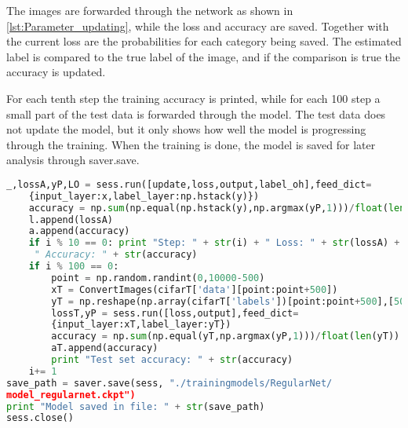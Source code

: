 The images are forwarded through the network as shown in \ref{lst:Parameter_updating}, while the loss and accuracy are saved. Together with the current loss are the probabilities for each category being saved. The estimated label is compared to the true label of the image, and if the comparison is true the accuracy is updated.

For each tenth step the training accuracy is printed, while for each 100 step a small part of the test data is forwarded through the model. The test data does not update the model, but it only shows how well the model is progressing through the training. When the training is done, the model is saved for later analysis through saver.save.

\begin{lstlisting}[language=Python, label=lst:Parameter_updating, caption=Parameter updating: loss and accuracy are saved and they are tested every 100 steps]
	_,lossA,yP,LO = sess.run([update,loss,output,label_oh],feed_dict=
	{input_layer:x,label_layer:np.hstack(y)})
	accuracy = np.sum(np.equal(np.hstack(y),np.argmax(yP,1)))/float(len(y))
	l.append(lossA)
	a.append(accuracy)
	if i % 10 == 0: print "Step: " + str(i) + " Loss: " + str(lossA) +
	 " Accuracy: " + str(accuracy)
	if i % 100 == 0: 
		point = np.random.randint(0,10000-500)
		xT = ConvertImages(cifarT['data'][point:point+500]) 
		yT = np.reshape(np.array(cifarT['labels'])[point:point+500],[500])
		lossT,yP = sess.run([loss,output],feed_dict=
		{input_layer:xT,label_layer:yT})
		accuracy = np.sum(np.equal(yT,np.argmax(yP,1)))/float(len(yT))
		aT.append(accuracy)
		print "Test set accuracy: " + str(accuracy)
	i+= 1
save_path = saver.save(sess, "./trainingmodels/RegularNet/
model_regularnet.ckpt")
print "Model saved in file: " + str(save_path)
sess.close()
\end{lstlisting}



